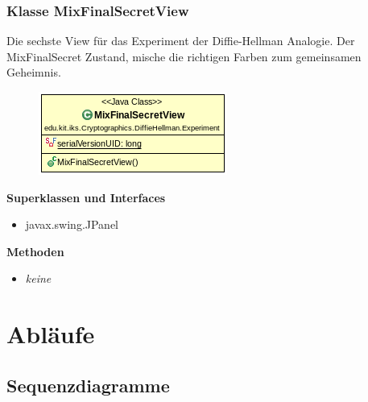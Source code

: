 \documentclass{article}
\begin{document}
\subsubsection{Klasse MixFinalSecretView}
      Die sechste View für das Experiment der Diffie-Hellman Analogie.
      Der MixFinalSecret Zustand, mische die richtigen Farben
      zum gemeinsamen Geheimnis.

      \begin{figure}[H]
        \centering
        \includegraphics{resources/edu-kit-iks-Cryptographics-DiffieHellman-Experiment-MixFinalSecretView}
      \end{figure}

      \textbf{Superklassen und Interfaces}
      \begin{itemize}
        \item javax.swing.JPanel
      \end{itemize}

      \textbf{Methoden}
      \begin{itemize}
        \item \textit{keine}
      \end{itemize}

\section{Abläufe}

\subsection{Sequenzdiagramme}
\end{document}
